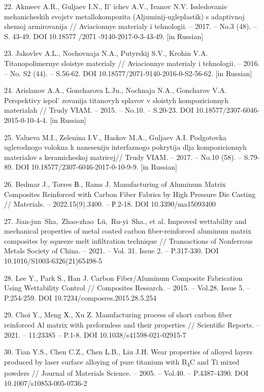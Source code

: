 22. Akmeev A.R., Guljaev I.N., Il' ichev A.V., Ivanov N.V.
Issledovanie mehanicheskih svojstv metallokompozita
(Aljuminij-ugleplastik) s adaptivnoj shemoj armirovanija //
Aviacionnye materialy i tehnologii. -- 2017. -- No.3 (48). -- S.
43-49. DOI 10.18577 /2071 -9140-2017-0-3-43-49. {[}in Russian{]}

23. Jakovlev A.L., Nochovnaja N.A., Putyrskij S.V., Krohin V.A.
Titanopolimernye sloistye materialy // Aviacionnye materialy i
tehnologii. -- 2016. -- No. S2 (44). -- S.56-62. DOI
10.18577/2071-9140-2016-0-S2-56-62. {[}in Russian{]}

24. Arislanov A.A., Goncharova L.Ju., Nochnaja N.A., Goncharov V.A.
Perspektivy ispol' zovanija titanovyh splavov v
sloistyh kompozicionnyh materialah // Trudy VIAM. -- 2015. -- No.10.
-- S.20-23. DOI 10.18577/2307-6046-2015-0-10-4-4. {[}in Russian{]}

25. Valueva M.I., Zelenina I.V., Haskov M.A., Guljaev A.I. Podgotovka
uglerodnogo volokna k naneseniju interfaznogo pokrytija dlja
kompozicionnyh materialov s keramicheskoj matricej// Trudy VIAM. --
2017. -- No.10 (58). -- S.79-89. DOI
10.18577/2307-6046-2017-0-10-9-9. {[}in Russian{]}

26. Bedmar J., Torres В., Rams J. Manufacturing of Aluminum Matrix
Composites Reinforced with Carbon Fiber Fabrics by High Pressure Die
Casting // Materials. -- 2022.15(9).3400. -- Р.2-18. DOI
10.3390/ma15093400

27. Jian-jun~Sha,~Zhao-zhao~Lü,~Ru-yi~Sha., et al. Improved wettability
and mechanical properties of metal coated carbon fiber-reinforced
aluminum matrix composites by squeeze melt infiltration technique //
Transactions of Nonferrous Metals Society of China. -- 2021. -- Vol.
31. Issue 2. -- P.317-330. DOI 10.1016/S1003-6326(21)65498-5

28. Lee Y., Park S., Han J. Carbon Fiber/Aluminum Composite Fabrication
Using Wettability Control // Composites Research. -- 2015. -- Vol.28.
Issue 5. -- P.254-259. DOI 10.7234/composres.2015.28.5.254

29. Choi Y., Meng Х., Xu Z. Manufacturing process of short carbon fiber
reinforced Al matrix with preformless and their properties //
Scientific Reports. -- 2021. -- 11:23385 -- P.1-8. DOI
10.1038/s41598-021-02915-7

30. Tian Y.S., Chen C.Z., Chen L.B., Liu J.H. Wear properties of alloyed
layers produced by laser surface alloying of pure titanium with
B\textsubscript{4}C and Ti mixed powders // Journal of Materials
Science. -- 2005. -- Vol.40. -- P.4387-4390. DOI
10.1007/s10853-005-0736-2

